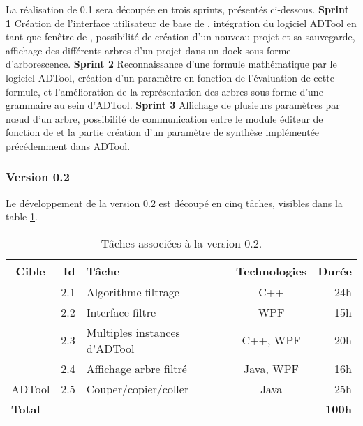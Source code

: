 		
		La réalisation de \glasir{} 0.1 sera découpée en trois sprints, présentés ci-dessous.\newline
		\textbf{Sprint 1} Création de l'interface utilisateur de base de \glasir{}, intégration du logiciel ADTool en tant que fenêtre de \glasir{}, possibilité de création d'un nouveau projet et sa sauvegarde, affichage des différents arbres d'un projet dans un dock sous forme d'arborescence.\newline
		\textbf{Sprint 2} Reconnaissance d'une formule mathématique par le logiciel ADTool, création d'un paramètre en fonction de l'évaluation de cette formule, et l'amélioration de la représentation des arbres sous forme d'une grammaire au sein d'ADTool.\newline
		\textbf{Sprint 3} Affichage de plusieurs paramètres par nœud d'un arbre, possibilité de communication entre le module éditeur de fonction de \glasir{} et la partie création d'un paramètre de synthèse implémentée précédemment dans ADTool.\newline


	\subsubsection{Version 0.2}
		Le développement de la version 0.2 est découpé en cinq tâches, visibles dans la {\sc table} \ref{tab:taches_units_2}.
		\begin{table}[h]
			\centering
			\begin{tabular}{|c|r|l|c|r|}
				\hline
				\textbf{Cible} & \textbf{Id} & \textbf{Tâche} & \textbf{Technologies} & \textbf{Durée}\\
				\hline

				\multirow{4}{*}{\glasir{}} & 2.1 & Algorithme filtrage & C++ & 24h\\
				\cline{2-5}
				 & 2.2 & Interface filtre & WPF & 15h\\
				\cline{2-5}
				 & 2.3 & Multiples instances d'ADTool & C++, WPF & 20h\\
				\cline{2-5}
				 & 2.4 & Affichage arbre filtré & Java, WPF & 16h\\
				\hline

				\multirow{1}{*}{ADTool} & 2.5 & Couper/copier/coller & \multirow{1}{*}{Java} & 25h\\
				\hline

				\multicolumn{4}{|l|}{\bf Total} & {\bf 100h}\\
				\hline
			\end{tabular}
			\caption{Tâches associées à la version 0.2.}
			\label{tab:taches_units_2}
		\end{table}
		
